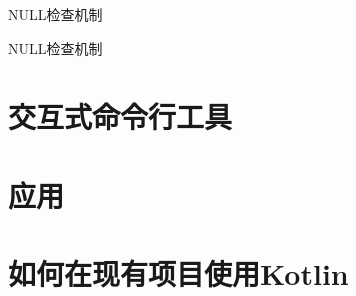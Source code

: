 \documentclass[xcolor={dvipsnames}]{beamer}
\begin{document}
\begin{frame}{NULL检查机制}
  
\end{frame}

\begin{frame}{NULL检查机制}
  
\end{frame}

\section{交互式命令行工具}
\begin{frame}
  
\end{frame}

\section{应用} %
\begin{frame}
\end{frame}

\section{如何在现有项目使用Kotlin}
\end{document}
